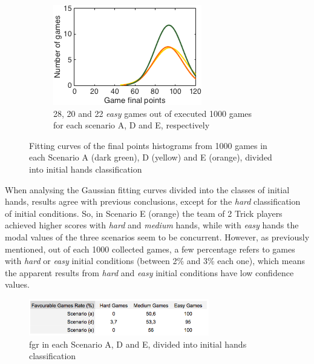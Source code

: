 \begin{figure}[h]
\begin{subfigure}[h]{0.32\textwidth}
                \includegraphics[width=\textwidth]{./img/4/ADEeasy}
                \caption{28, 20 and 22 \emph{easy} games out of executed 1000 games for each scenario A, D and E, respectively}
                \label{fig:ADEeasy}
        \end{subfigure}
        \caption{Fitting curves of the final points histograms from 1000 games in each Scenario A (dark green), D (yellow) and E (orange), divided into initial hands classification}
        \label{fig:ADE-CH}
\end{figure}

When analysing the Gaussian fitting curves divided into the classes of initial hands, results agree with previous conclusions, except for the \emph{hard} classification of initial conditions.
So, in Scenario E (orange) the team of 2 Trick players achieved higher scores with \emph{hard} and \emph{medium} hands, while with \emph{easy} hands the modal values of the three scenarios seem to be concurrent.
However, as previously mentioned, out of each 1000 collected games, a few percentage refers to games with \emph{hard} or \emph{easy} initial conditions (between 2\% and 3\% each one), which means the apparent results from \emph{hard} and \emph{easy} initial conditions have low confidence values.

\begin{figure}[h!]
  \centering
    \includegraphics[width=0.7\textwidth]{./img/4/ADE-fgr}
  \caption{\ac{fgr} in each Scenario A, D and E, divided into initial hands classification}
\label{fig:ADE-fgr}
\end{figure}

